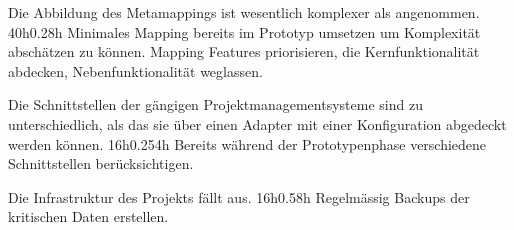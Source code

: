 		{Die Abbildung des Metamappings ist wesentlich komplexer als angenommen.}
		{40h}{0.2}{8h}
		{Minimales Mapping bereits im Prototyp umsetzen um Komplexität abschätzen zu können. Mapping Features priorisieren, die Kernfunktionalität abdecken, Nebenfunktionalität weglassen.}

		{Die Schnittstellen der gängigen Projektmanagementsysteme sind zu unterschiedlich, als das sie über einen Adapter mit einer Konfiguration abgedeckt werden können.}
		{16h}{0.25}{4h}
		{Bereits während der Prototypenphase verschiedene Schnittstellen berücksichtigen.}

		{Die Infrastruktur des Projekts fällt aus.}
		{16h}{0.5}{8h}
		{Regelmässig Backups der kritischen Daten erstellen.}
